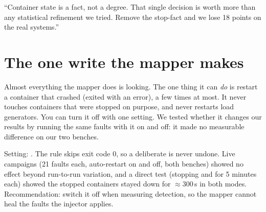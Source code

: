 \begin{saybox}
``Container state is a fact, not a degree. That single decision is worth more than any statistical refinement we tried. Remove the stop-fact and we lose 18 points on the real systems.''
\end{saybox}

\section{The one write the mapper makes}
\begin{simplebox}
Almost everything the mapper does is looking. The one thing it can \emph{do} is restart a container that crashed (exited with an error), a few times at most. It never touches containers that were stopped on purpose, and never restarts load generators. You can turn it off with one setting. We tested whether it changes our results by running the same faults with it on and off: it made no measurable difference on our two benches.
\end{simplebox}

\begin{techbox}
Setting: . The rule skips exit code 0, so a deliberate  is never undone. Live campaigns (21 faults each, auto-restart on and off, both benches) showed no effect beyond run-to-run variation, and a direct test (stopping  and  for 5 minutes each) showed the stopped containers stayed down for $\approx 300$\,s in both modes. Recommendation: switch it off when measuring detection, so the mapper cannot heal the faults the injector applies.
\end{techbox}
